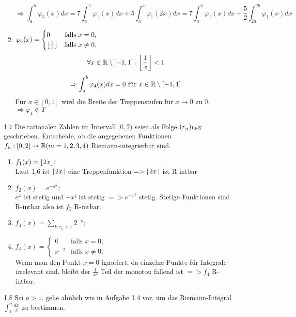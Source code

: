 \documentclass{HM}
\begin{document}
\begin{enumerate}
\begin{enumerate}
				$$\Rightarrow \int_a^b\varphi_3(x)dx=
				7\int_a^b\varphi_1(x)dx+5\int_a^b\varphi_1(2x)dx=
				7\int_a^b\varphi_1(x)dx+\frac{5}{2}\int_{2a}^{2b}\varphi_1(x)dx$$
			\item $\varphi_4(x)=\begin{cases}
				0&\text{falls }x=0,\\
				\floor{\frac{1}{x}}&\text{falls }x\neq 0.			
			\end{cases}$
			$$\forall x\in\R\setminus[-1,1]:\floor*{\frac{1}{x}}<1$$
			$$\Rightarrow \int_a^b\varphi_4(x)dx = 0 \text{ für } x\in\R\setminus[-1,1]$$
			Für $x\in[0,1]$ wird die Breite der Treppenstufen für $x\to 0$ zu $0$.\\
			$\Rightarrow \varphi_4\not\in T$
		\end{enumerate}
		
		\item[1.7] Die rationalen Zahlen im Intervall $[0,2)$ seien als Folge $(r_n)_{k\in\N}$ geschrieben. Entscheide, ob die angegebenen Funktionen $f_n:[0,2]\to\R(m=1,2,3,4)$ Riemann-integrierbar sind.
		\begin{enumerate}
			\item $f_1(x)=\floor{2x}$;\\
			Laut 1.6 ist $\floor{2x}$ eine Treppenfunktion $=> \floor{2x}$ ist R-intbar\\
			\item $f_2(x)=e^{-x^{2}}$;\\
			$e^x$ ist stetig und $-x²$ ist stetig $=>e^{-x^2}$ stetig. Stetige Funktionen sind R-intbar also ist $f_2$ R-intbar. 
			
			\item $f_3(x)=\sum\limits_{k:r_k<x}2^{-k}$;
			
			\item $f_4(x)=\begin{cases}
				0&\text{falls }x=0,\\
				x^{-2}&\text{falls }x\neq 0.			
			\end{cases}$\\
			Wenn man den Punkt $x=0$ ignoriert, da einzelne Punkte für Integrale irrelevant sind, bleibt der $\frac{1}{x^2}$ Teil der monoton fallend ist $=>f_4$ R-intbar. 
		\end{enumerate}
		
		\item[1.8] Sei $a>1$. gehe ähnlich wie in Aufgabe 1.4 vor, um das Riemann-Integral $\int_1^a\frac{dx}{x}$ zu bestimmen.
	\end{enumerate}
\end{document}
